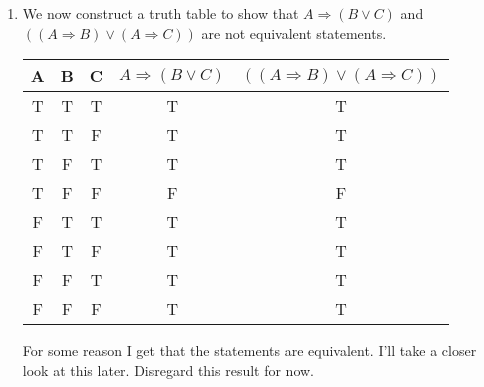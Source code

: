 \documentclass[a4paper, 11pt]{report}
\theoremstyle{plain}
\theoremstyle{definition}
\newcommand{\impl}{\Longrightarrow}
\renewcommand{\neg}{{\sim}} %
\begin{document}
\begin{enumerate}
\begin{enumerate}[a)]
        This is not very rigorous, but constructing a truth table will show
        that it holds.
      
      \item We consider the statement "Every even integer greater than 2 can be expressed as the sum of two prime numbers".
        We want to find two equivalent rephrasing of this statement. We first observe
        that it is on the form
        \begin{quote}
          For all integers $x$, if $x$ is even and $x > 2$, then $x$ can be written as the sum of two prime numbers.
        \end{quote}
        We can now consider for instance the contrapositive of this statement:
        \begin{quote}
          For all integers $x$, if $x$ cannot be written as the sum of two
          prime numbers, then $x$ is odd or $x \leq 2$.\footnote{I do
          \textbf{not}negate the quantifier here because it is not part of the
        conclusion nor the hypothesis hence does not get negated.}
        \end{quote}

        We can also rephrase the statement in terms of a contradiction. We assume the negation of the implication.
        \begin{quote}
          "If $x$ is even and $x > 2$, and $x$ cannot be written as the sum of
          two prime numbers, then $P \land \neg P$."
        \end{quote} 
        where $P$ is some arbitrary statement.
    \end{enumerate}  

    I did not consider these restatements when doing the thought-experiment. It
    does give a new perspective on the problem.

    \item We now construct a truth table to show that $A \impl (B \lor C)$ and
      $((A \impl B) \lor (A \impl C))$ are not equivalent statements.
      
      \begin{table}[h!]
        \centering
        \label{tab:label}
        \begin{tabular}{ccccc}
          \hline
         A&  B&  C&  $A \impl (B \lor C)$& $((A \impl B) \lor (A \impl C))$\\
          \hline
         T&  T&  T&  T& T\\
         T&  T&  F&  T& T\\
         T&  F&  T&  T& T\\
         T&  F&  F&  F& F\\
         F&  T&  T&  T& T\\
         F&  T&  F&  T& T\\
         F&  F&  T&  T& T\\
         F&  F&  F&  T& T\\
          \hline
        \end{tabular}
      \end{table}
      For some reason I get that the statements are equivalent. I'll take a
      closer look at this later. Disregard this result for now.
  

\end{enumerate}
\end{document}
